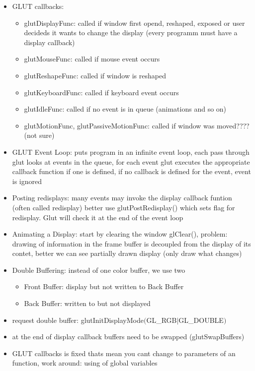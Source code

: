 \documentclass[11pt,a4paper]{article}
\begin{document}
\begin{itemize}
		\item GLUT callbacks:
		\begin{itemize}
			\item glutDisplayFunc: called if window first opend, reshaped, exposed or user decideds it wants to change the display (every programm must have a display callback)
			\item glutMouseFunc: called if mouse event occurs
			\item glutReshapeFunc: called if window is reshaped
			\item glutKeyboardFunc: called if keyboard event occurs
			\item glutIdleFunc: called if no event is in queue (animations and so on)
			\item glutMotionFunc, glutPassiveMotionFunc: called if window was moved????(not sure)
		\end{itemize}
		\item GLUT Event Loop: puts program in an infinite event loop, each pass through glut looks at events in the queue, for each event glut executes the appropriate callback function if one is defined, if no callback is defined for the event, event is ignored
		\item Posting redisplays: many events may invoke the display callback funtion (often called redisplay) better use glutPostRedisplay() which sets flag for redisplay. Glut will check it at the end of the event loop
		\item Animating a Display: start by clearing the window glClear(), problem: drawing of information in the frame buffer is decoupled from the display of its contet, better we can see partially drawn display (only draw what changes)
		\item Double Buffering: instead of one color buffer, we use two
		\begin{itemize}
			\item Front Buffer: display but not written to Back Buffer
			\item Back Buffer: written to but not displayed
		\end{itemize}
		\item request double buffer: glutInitDisplayMode$($GL\_RGB$|$GL\_DOUBLE$)$
		\item at the end of display callback buffers need to be swapped (glutSwapBuffers)
		\item GLUT callbacks is fixed thats mean you cant change to parameters of an function, work around: using of global variables 
	\end{itemize}
	
\end{document}
